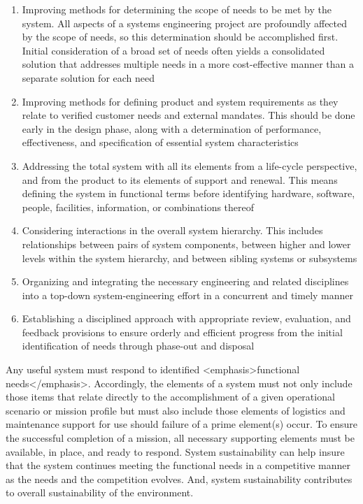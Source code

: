 \begin{enumerate}
\item Improving methods for determining the scope of needs to be met by the system. All aspects of a systems engineering project are profoundly affected by the scope of needs, so this determination should be accomplished first. Initial consideration of a broad set of needs often yields a consolidated solution that addresses multiple needs in a more cost-effective manner than a separate solution for each need
\item Improving methods for defining product and system requirements as they relate to verified customer needs and external mandates. This should be done early in the design phase, along with a determination of performance, effectiveness, and specification of essential system characteristics
\item Addressing the total system with all its elements from a life-cycle perspective, and from the product to its elements of support and renewal. This means defining the system in functional terms before identifying hardware, software, people, facilities, information, or combinations thereof
\item Considering interactions in the overall system hierarchy. This includes relationships between pairs of system components, between higher and lower levels within the system hierarchy, and between sibling systems or subsystems
\item Organizing and integrating the necessary engineering and related disciplines into a top-down system-engineering effort in a concurrent and timely manner
\item Establishing a disciplined approach with appropriate review, evaluation, and feedback provisions to ensure orderly and efficient progress from the initial identification of needs through phase-out and disposal
\end{enumerate}

Any useful system must respond to identified <emphasis>functional needs</emphasis>. Accordingly, the elements of a system must not only include those items that relate directly to the accomplishment of a given operational scenario or mission profile but must also include those elements of logistics and maintenance support for use should failure of a prime element(s) occur. To ensure the successful completion of a mission, all necessary supporting elements must be available, in place, and ready to respond. System sustainability can help insure that the system continues meeting the functional needs in a competitive manner as the needs and the competition evolves. And, system sustainability contributes to overall sustainability of the environment.

